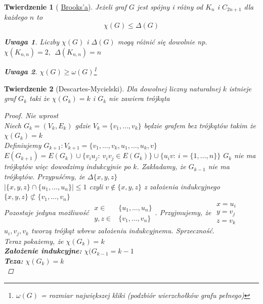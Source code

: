\documentclass[12pt,a4paper]{article}
\newtheorem{tw}{Twierdzenie}
\theoremstyle{definition}
\newtheorem{uwaga}{Uwaga}
\begin{document}
\begin{tw}[ \href{http://en.wikipedia.org/wiki/R._Leonard_Brooks}{Brooks'a}]
Jeżeli graf $G$ jest spójny i różny od $K_n$ i $C_{2n+1}$ dla każdego $n$ to $$\chi(G) \leqslant \Delta(G)$$
\begin{uwaga}
Liczby $\chi(G)$ i $\Delta(G)$ mogą różnić się dowolnie np. $\chi(K_{n,n}) = 2,~~ \Delta(K_{n,n}) = n$
\end{uwaga}
\begin{uwaga}
$\chi(G)\geqslant\omega(G)$\footnote{$\omega(G)$ = rozmiar największej kliki (podzbiór wierzchołków grafu pełnego)}
\end{uwaga}
\end{tw}

\begin{tw}[Descartes-Mycielski]
Dla dowolnej liczny naturalnej $k$ istnieje graf $G_k$ taki że $\chi(G_k)= k$ i $G_k$ nie zawiera trójkąta
\begin{proof}Nie wprost\\
Niech $G_k = (V_k, E_k)$ gdzie $V_k = \{v_1,\dots ,v_k\}$ będzie grafem bez trójkątów takim że $\chi(G_k) = k$\\
Definiujemy $G_{k+1} : V_{k+1} = \{v_1,\dots ,v_k, u_1,\dots, u_k, v\}$\\
$E(G_{k+1}) = E(G_k) \cup \{v_iu_j: ~ v_iv_j\in E(G_k)\} \cup \{u_iv : ~ i=\{1, \dots, n\}\}$
$G_k$ nie ma trójkątów więc dowodzimy indukcyjnie po $k$. Zakładamy, że $G_{k-1}$ nie ma trójkątów. Przypuśćmy, że $\Delta\{x,y,z\}$\\
$|\{x,y,z\} \cap \{u_1,\dots, u_n\}| \leqslant 1$ czyli $v\not\in \{x,y,z\}$ z założenia indukcyjnego $\{x,y,z\} \not\subset \{v_1,\dots, v_n\}$\\
Pozostaje jedyna możliwość $\begin{matrix}x\in & \{u_1,\dots,u_n\} \\ y,z\in & \{v_1,\dots,v_n\}\end{matrix}$. Przyjmujemy, że $\begin{matrix}x = u_i \\ y = v_j \\ z = v_k\end{matrix}$\\
$u_i,v_j,v_k$ tworzą trójkąt wbrew założeniu indukcyjnemu. Sprzeczność.\\
\emph{Teraz pokażemy, że $\chi(G_k) = k$\\}
\textbf{Założenie indukcyjne:} $\chi(G_{k-1} = k-1$\\
\textbf{Teza:} $\chi(G_k) = k$\\

\end{proof}
\end{tw}
\end{document}
